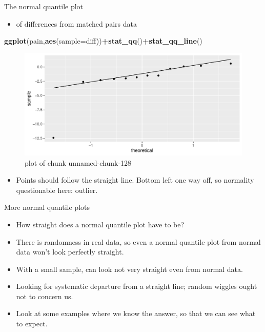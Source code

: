 \documentclass[ignorenonframetext,]{beamer}
\newenvironment{Shaded}{\begin{snugshade}}{\end{snugshade}}
\newcommand{\DataTypeTok}[1]{\textcolor[rgb]{0.13,0.29,0.53}{#1}}
\newcommand{\KeywordTok}[1]{\textcolor[rgb]{0.13,0.29,0.53}{\textbf{#1}}}
\newcommand{\NormalTok}[1]{#1}
\newcommand{\OperatorTok}[1]{\textcolor[rgb]{0.81,0.36,0.00}{\textbf{#1}}}
\providecommand{\tightlist}{%
  \setlength{\itemsep}{0pt}\setlength{\parskip}{0pt}}
\begin{document}
\begin{frame}[fragile]{The normal quantile plot}
\protect\hypertarget{the-normal-quantile-plot}{}

\begin{itemize}
\tightlist
\item
  of differences from matched pairs data
\end{itemize}

\begin{Shaded}
\begin{Highlighting}[]
\KeywordTok{ggplot}\NormalTok{(pain,}\KeywordTok{aes}\NormalTok{(}\DataTypeTok{sample=}\NormalTok{diff))}\OperatorTok{+}\KeywordTok{stat_qq}\NormalTok{()}\OperatorTok{+}\KeywordTok{stat_qq_line}\NormalTok{()}
\end{Highlighting}
\end{Shaded}

\begin{figure}
\centering
\includegraphics{figure/unnamed-chunk-128-1.pdf}
\caption{plot of chunk unnamed-chunk-128}
\end{figure}

\begin{itemize}
\tightlist
\item
  Points should follow the straight line. Bottom left one way off, so
  normality questionable here: outlier.
\end{itemize}

\end{frame}

\begin{frame}{More normal quantile plots}
\protect\hypertarget{more-normal-quantile-plots}{}

\begin{itemize}
\tightlist
\item
  How straight does a normal quantile plot have to be?
\item
  There is randomness in real data, so even a normal quantile plot from
  normal data won't look perfectly straight.
\item
  With a small sample, can look not very straight even from normal data.
\item
  Looking for systematic departure from a straight line; random wiggles
  ought not to concern us.
\item
  Look at some examples where we know the answer, so that we can see
  what to expect.
\end{itemize}

\end{frame}
\end{document}
